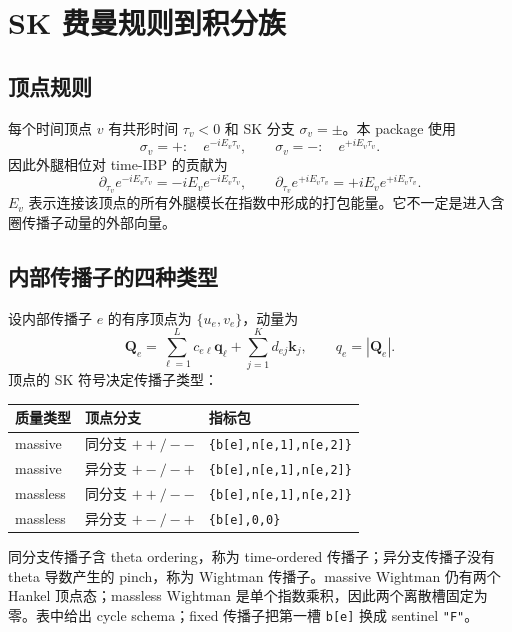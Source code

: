 ﻿\documentclass[a4paper,11pt]{article}
\begin{document}
\section{SK 费曼规则到积分族}

\subsection{顶点规则}

每个时间顶点 $v$ 有共形时间 $\tau_v<0$ 和 SK 分支 $\sigma_v=\pm$。本 package 使用
\begin{equation}
  \sigma_v=+:\quad e^{-iE_v\tau_v},
  \qquad
  \sigma_v=-:\quad e^{+iE_v\tau_v}.
\end{equation}
因此外腿相位对 time-IBP 的贡献为
\begin{equation}
  \partial_{\tau_v}e^{-iE_v\tau_v}=-iE_v e^{-iE_v\tau_v},
  \qquad
  \partial_{\tau_v}e^{+iE_v\tau_v}=+iE_v e^{+iE_v\tau_v}.
  \label{vertexPhaseRule}
\end{equation}
$E_v$ 表示连接该顶点的所有外腿模长在指数中形成的打包能量。它不一定是进入含圈传播子动量的外部向量。

\subsection{内部传播子的四种类型}

设内部传播子 $e$ 的有序顶点为 $\{u_e,v_e\}$，动量为
\begin{equation}
 \bm Q_e=\sum_{\ell=1}^{L}c_{e\ell}\bm q_\ell
        +\sum_{j=1}^{K}d_{ej}\bm k_j,
 \qquad q_e=|\bm Q_e|.
\end{equation}
顶点的 SK 符号决定传播子类型：
\begin{center}
\begin{tabular}{lll}
\toprule
质量类型 & 顶点分支 & 指标包\\
\midrule
massive & 同分支 $++/--$ & \texttt{\{b[e],n[e,1],n[e,2]\}}\\
massive & 异分支 $+-/-+$ & \texttt{\{b[e],n[e,1],n[e,2]\}}\\
massless & 同分支 $++/--$ & \texttt{\{b[e],n[e,1],n[e,2]\}}\\
massless & 异分支 $+-/-+$ & \texttt{\{b[e],0,0\}}\\
\bottomrule
\end{tabular}
\end{center}
同分支传播子含 theta ordering，称为 time-ordered 传播子；异分支传播子没有 theta 导数产生的 pinch，称为 Wightman 传播子。massive Wightman 仍有两个 Hankel 顶点态；massless Wightman 是单个指数乘积，因此两个离散槽固定为零。表中给出 cycle schema；fixed 传播子把第一槽 \texttt{b[e]} 换成 sentinel \texttt{"F"}。
\end{document}
